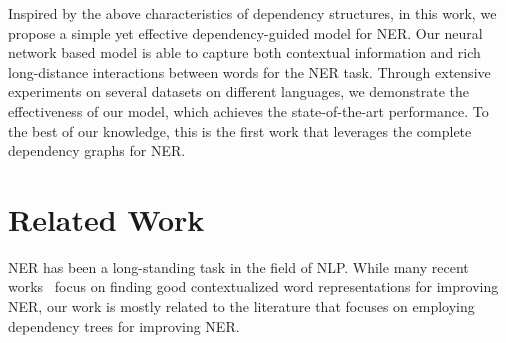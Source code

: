 
Inspired by the above characteristics of dependency structures, in this work, we propose a simple yet effective dependency-guided model for NER. 
Our neural network based model is able to capture both contextual information and rich long-distance interactions between words for the NER task. 
Through extensive experiments on several datasets on different languages, we demonstrate the effectiveness of our model, which achieves the state-of-the-art performance. 
To the best of our knowledge, this is the first work that leverages the complete dependency graphs for NER.


\section{Related Work}
NER has been a long-standing task in the field of NLP. 
While many recent works~\cite{peters2018deep,akbik2018coling,devlin2019bert} focus on finding good contextualized word representations for improving NER, our work is mostly related to the literature that focuses on employing dependency trees for improving NER. 


